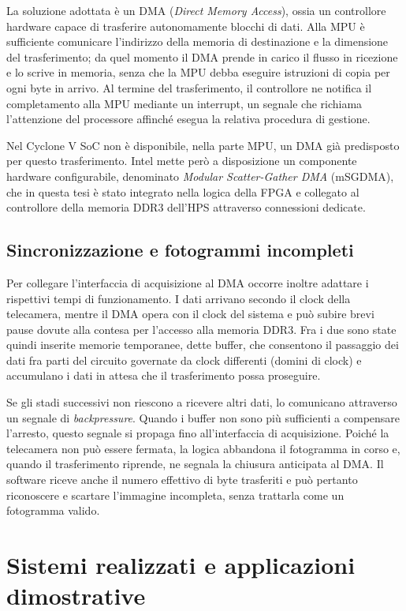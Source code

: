 La soluzione adottata è un DMA (\emph{Direct Memory Access}), ossia un controllore hardware capace di trasferire autonomamente blocchi di dati. Alla MPU è sufficiente comunicare l'indirizzo della memoria di destinazione e la dimensione del trasferimento; da quel momento il DMA prende in carico il flusso in ricezione e lo scrive in memoria, senza che la MPU debba eseguire istruzioni di copia per ogni byte in arrivo. Al termine del trasferimento, il controllore ne notifica il completamento alla MPU mediante un interrupt, un segnale che richiama l'attenzione del processore affinché esegua la relativa procedura di gestione.

Nel Cyclone V SoC non è disponibile, nella parte MPU, un DMA già predisposto per questo trasferimento. Intel mette però a disposizione un componente hardware configurabile, denominato \emph{Modular Scatter-Gather DMA} (mSGDMA), che in questa tesi è stato integrato nella logica della FPGA e collegato al controllore della memoria DDR3 dell'HPS attraverso connessioni dedicate.

\subsection{Sincronizzazione e fotogrammi incompleti}

Per collegare l'interfaccia di acquisizione al DMA occorre inoltre adattare i rispettivi tempi di funzionamento. I dati arrivano secondo il clock della telecamera, mentre il DMA opera con il clock del sistema e può subire brevi pause dovute alla contesa per l'accesso alla memoria DDR3. Fra i due sono state quindi inserite memorie temporanee, dette buffer, che consentono il passaggio dei dati fra parti del circuito governate da clock differenti (domini di clock) e accumulano i dati in attesa che il trasferimento possa proseguire.

Se gli stadi successivi non riescono a ricevere altri dati, lo comunicano attraverso un segnale di \emph{backpressure}. Quando i buffer non sono più sufficienti a compensare l'arresto, questo segnale si propaga fino all'interfaccia di acquisizione. Poiché la telecamera non può essere fermata, la logica abbandona il fotogramma in corso e, quando il trasferimento riprende, ne segnala la chiusura anticipata al DMA. Il software riceve anche il numero effettivo di byte trasferiti e può pertanto riconoscere e scartare l'immagine incompleta, senza trattarla come un fotogramma valido.

\section{Sistemi realizzati e applicazioni dimostrative}

